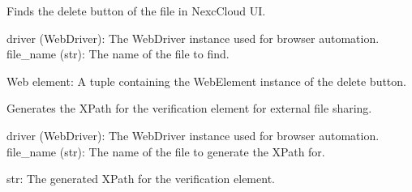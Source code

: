 \documentclass[letterpaper,10pt,english]{sphinxmanual}
\begin{document}
\begin{fulllineitems}
\label{\detokenize{utils:utils.file_management.find_delete_button}}
\pysigstartsignatures
{}
\pysigstopsignatures
\sphinxAtStartPar
Finds the delete button of the file in NexcCloud UI.
\begin{description}
\sphinxAtStartPar
driver (WebDriver): The WebDriver instance used for browser automation.
file\_name (str): The name of the file to find.

\sphinxAtStartPar
Web element: A tuple containing the WebElement instance of the delete button.

\end{description}

\end{fulllineitems}


\begin{fulllineitems}
\label{\detokenize{utils:utils.file_management.generate_external_share_verification_element}}
\pysigstartsignatures
{}
\pysigstopsignatures
\sphinxAtStartPar
Generates the XPath for the verification element for external file sharing.
\begin{description}
\sphinxAtStartPar
driver (WebDriver): The WebDriver instance used for browser automation.
file\_name (str): The name of the file to generate the XPath for.

\sphinxAtStartPar
str: The generated XPath for the verification element.

\end{description}

\end{fulllineitems}

\end{document}
